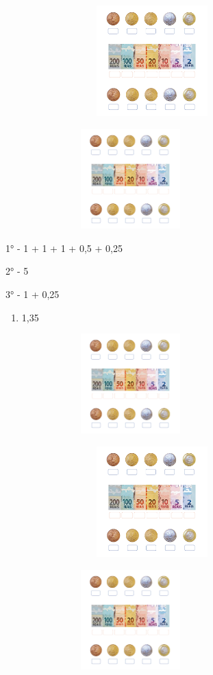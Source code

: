 \includegraphics[width=4.45833in,height=1.68116in]{media/image72.png}

\includegraphics[width=3.80208in,height=1.51291in]{media/image73.png}

1° - 1 + 1 + 1 + 0,5 + 0,25

2° - 5

3° - 1 + 0,25

\begin{enumerate}
\def\labelenumi{\alph{enumi})}
\item
  1,35
\end{enumerate}

\includegraphics[width=3.80208in,height=1.51291in]{media/image73.png}

\includegraphics[width=4.45833in,height=1.68116in]{media/image72.png}

\includegraphics[width=3.80208in,height=1.51291in]{media/image73.png}

